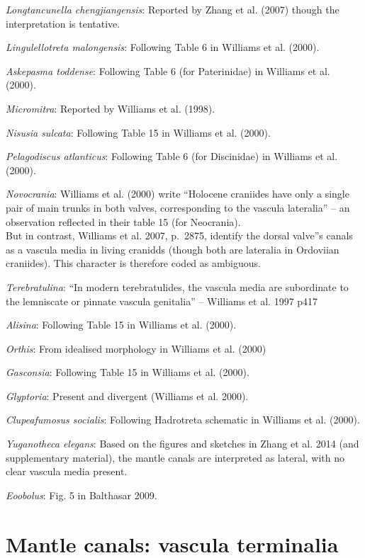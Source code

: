 \documentclass[]{book}
\theoremstyle{definition}
\theoremstyle{definition}
\theoremstyle{definition}
\theoremstyle{remark}
\begin{document}
\emph{Longtancunella chengjiangensis}: Reported by Zhang et al. (2007)
though the interpretation is tentative.

\emph{Lingulellotreta malongensis}: Following Table 6 in Williams et al.
(2000).

\emph{Askepasma toddense}: Following Table 6 (for Paterinidae) in
Williams et al. (2000).

\emph{Micromitra}: Reported by Williams et al. (1998).

\emph{Nisusia sulcata}: Following Table 15 in Williams et al. (2000).

\emph{Pelagodiscus atlanticus}: Following Table 6 (for Discinidae) in
Williams et al. (2000).

\emph{Novocrania}: Williams et al. (2000) write ``Holocene craniides
have only a single pair of main trunks in both valves, corresponding to
the vascula lateralia'' -- an observation reflected in their table 15
(for Neocrania).\\
But in contrast, Williams et al. 2007, p.~2875, identify the dorsal
valve''s canals as a vascula media in living cranidds (though both are
lateralia in Ordoviian craniides). This character is therefore coded as
ambiguous.

\emph{Terebratulina}: ``In modern terebratulides, the vascula media are
subordinate to the lemniscate or pinnate vascula genitalia'' -- Williams
et al. 1997 p417

\emph{Alisina}: Following Table 15 in Williams et al. (2000).

\emph{Orthis}: From idealised morphology in Williams et al. (2000)

\emph{Gasconsia}: Following Table 15 in Williams et al. (2000).

\emph{Glyptoria}: Present and divergent (Williams et al. 2000).

\emph{Clupeafumosus socialis}: Following Hadrotreta schematic in
Williams et al. (2000).

\emph{Yuganotheca elegans}: Based on the figures and sketches in Zhang
et al. 2014 (and supplementary material), the mantle canals are
interpreted as lateral, with no clear vascula media present.

\emph{Eoobolus}: Fig. 5 in Balthasar 2009.

\hypertarget{mantle-canals-vascula-terminalia}{%
\section*{Mantle canals: vascula
terminalia}\label{mantle-canals-vascula-terminalia}}
\end{document}
